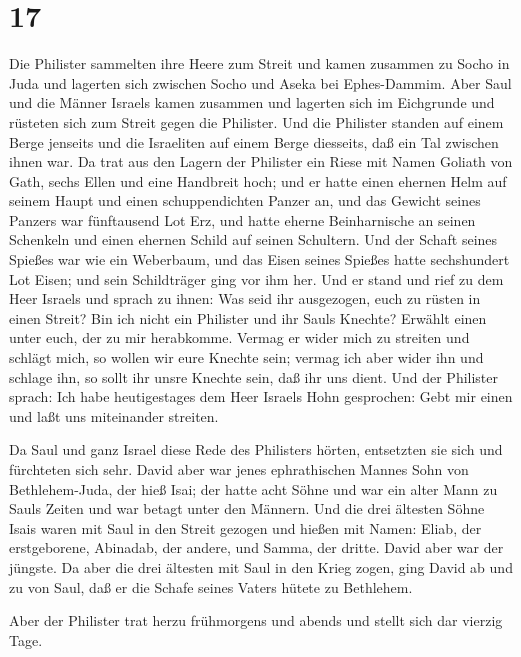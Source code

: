 \hypertarget{section-16}{%
\section{17}\label{section-16}}

 Die Philister sammelten ihre Heere zum Streit und kamen
zusammen zu Socho in Juda und lagerten sich zwischen Socho und Aseka bei
Ephes-Dammim.  Aber Saul und die Männer Israels kamen
zusammen und lagerten sich im Eichgrunde und rüsteten sich zum Streit
gegen die Philister.  Und die Philister standen auf einem
Berge jenseits und die Israeliten auf einem Berge diesseits, daß ein Tal
zwischen ihnen war.  Da trat aus den Lagern der Philister
ein Riese mit Namen Goliath von Gath, sechs Ellen und eine Handbreit
hoch;  und er hatte einen ehernen Helm auf seinem Haupt und
einen schuppendichten Panzer an, und das Gewicht seines Panzers war
fünftausend Lot Erz,  und hatte eherne Beinharnische an
seinen Schenkeln und einen ehernen Schild auf seinen Schultern.
 Und der Schaft seines Spießes war wie ein Weberbaum, und
das Eisen seines Spießes hatte sechshundert Lot Eisen; und sein
Schildträger ging vor ihm her.  Und er stand und rief zu dem
Heer Israels und sprach zu ihnen: Was seid ihr ausgezogen, euch zu
rüsten in einen Streit? Bin ich nicht ein Philister und ihr Sauls
Knechte? Erwählt einen unter euch, der zu mir herabkomme. 
Vermag er wider mich zu streiten und schlägt mich, so wollen wir eure
Knechte sein; vermag ich aber wider ihn und schlage ihn, so sollt ihr
unsre Knechte sein, daß ihr uns dient.  Und der Philister
sprach: Ich habe heutigestages dem Heer Israels Hohn gesprochen: Gebt
mir einen und laßt uns miteinander streiten.

 Da Saul und ganz Israel diese Rede des Philisters hörten,
entsetzten sie sich und fürchteten sich sehr.  David aber
war jenes ephrathischen Mannes Sohn von Bethlehem-Juda, der hieß Isai;
der hatte acht Söhne und war ein alter Mann zu Sauls Zeiten und war
betagt unter den Männern.  Und die drei ältesten Söhne
Isais waren mit Saul in den Streit gezogen und hießen mit Namen: Eliab,
der erstgeborene, Abinadab, der andere, und Samma, der dritte.
 David aber war der jüngste. Da aber die drei ältesten mit
Saul in den Krieg zogen,  ging David ab und zu von Saul,
daß er die Schafe seines Vaters hütete zu Bethlehem.

 Aber der Philister trat herzu frühmorgens und abends und
stellt sich dar vierzig Tage.

